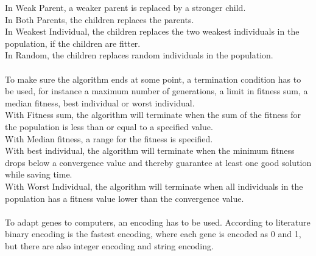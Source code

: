 In Weak Parent, a weaker parent is replaced by a stronger child.\\
In Both Parents, the children replaces the parents.\\
In Weakest Individual, the children replaces the two weakest individuals in the population, if the children are fitter.\\
In Random, the children replaces random individuals in the population.\\
\\
To make sure the algorithm ends at some point, a termination condition has to be used, for instance a maximum number of generations, a limit in fitness sum, a median fitness, best individual or worst individual.\\
With Fitness sum, the algorithm will terminate when the sum of the fitness for the population is less than or equal to a specified value.\\
With Median fitness, a range for the fitness is specified.\\
With best individual, the algorithm will terminate when the minimum fitness drops below a convergence value and thereby guarantee at least one good solution while saving time.\\
With Worst Individual, the algorithm will terminate when all individuals in the population has a fitness value lower than the convergence value.\\
\\
To adapt genes to computers, an encoding has to be used.  According to literature \cite{GAHandbook1} binary encoding is the fastest encoding, where each gene is encoded as 0 and 1, but there are also integer encoding and string encoding.\\
